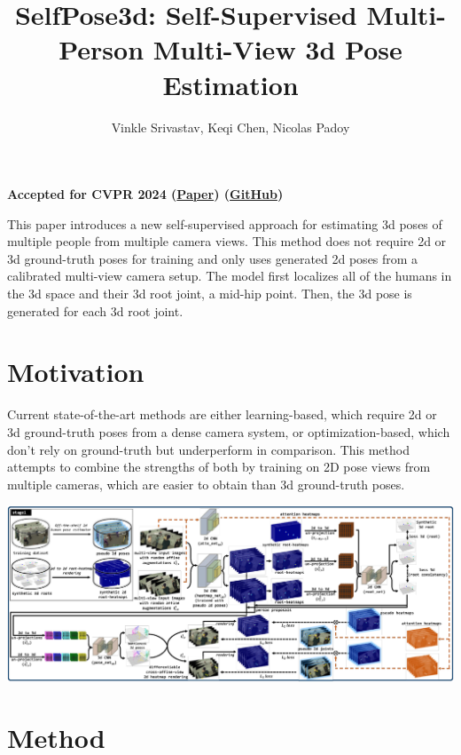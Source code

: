\documentclass{article}
\title{SelfPose3d: Self-Supervised Multi-Person Multi-View 3d Pose Estimation}
\author{Vinkle Srivastav, Keqi Chen, Nicolas Padoy}
\date{}
\begin{document}
\maketitle

\begin{center}\textbf{Accepted for CVPR 2024 (\href{https://arxiv.org/pdf/2404.02041}{Paper}) (\href{https://github.com/CAMMA-public/SelfPose3d}{GitHub})}\end{center}

This paper introduces a new self-supervised approach for estimating 3d poses of multiple people from multiple camera views. This method does not require 2d or 3d ground-truth poses for training and only uses generated 2d poses from a calibrated multi-view camera setup. The model first localizes all of the humans in the 3d space and their 3d root joint, a mid-hip point. Then, the 3d pose is generated for each 3d root joint.

\section*{Motivation}

Current state-of-the-art methods are either learning-based, which require 2d or 3d ground-truth poses from a dense camera system, or optimization-based, which don't rely on ground-truth but underperform in comparison. This method attempts to combine the strengths of both by training on 2D pose views from multiple cameras, which are easier to obtain than 3d ground-truth poses.

\begin{center}
    \includegraphics[scale=0.4]{selfpose3d-1.png}
\end{center}

\section*{Method}
\end{document}
